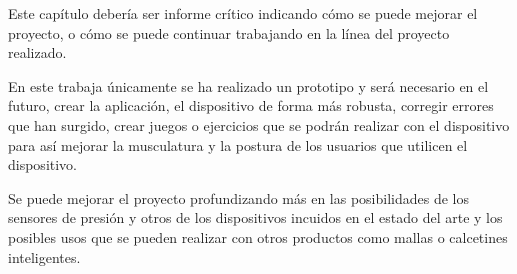 


Este capítulo debería ser informe crítico indicando cómo se puede mejorar el proyecto, o cómo se puede continuar trabajando en la línea del proyecto realizado.

En este trabaja únicamente se ha realizado un prototipo y será necesario en el futuro, crear la aplicación, el dispositivo de forma más robusta, corregir errores que han surgido, crear juegos o ejercicios que se podrán realizar con el dispositivo para así mejorar la musculatura y la postura de los usuarios que utilicen el dispositivo.

Se puede mejorar el proyecto profundizando más en las posibilidades de los sensores de presión y otros de los dispositivos incuidos en el estado del arte y los posibles usos que se pueden realizar con  otros productos como mallas o calcetines inteligentes.